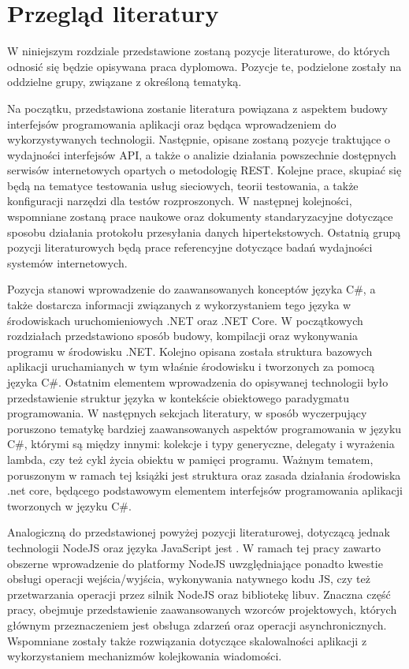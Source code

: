 \section{Przegląd literatury}
W niniejszym rozdziale przedstawione zostaną pozycje literaturowe, do których odnosić się będzie opisywana praca dyplomowa. Pozycje te, podzielone zostały na oddzielne grupy, związane z określoną tematyką.

Na początku, przedstawiona zostanie literatura powiązana z aspektem budowy interfejsów programowania aplikacji oraz będąca wprowadzeniem do wykorzystywanych technologii. Następnie, opisane zostaną pozycje traktujące o wydajności interfejsów API, a także o analizie działania powszechnie dostępnych serwisów internetowych opartych o metodologię REST. Kolejne prace, skupiać się będą na tematyce testowania usług sieciowych, teorii testowania, a także konfiguracji narzędzi dla testów rozproszonych. W następnej kolejności, wspomniane zostaną prace naukowe oraz dokumenty standaryzacyjne dotyczące sposobu działania protokołu przesyłania danych hipertekstowych. Ostatnią grupą pozycji literaturowych będą prace referencyjne dotyczące badań wydajności systemów internetowych.

Pozycja \cite{troelsen2017pro} stanowi wprowadzenie do zaawansowanych konceptów języka C\#, a także dostarcza informacji związanych z wykorzystaniem tego języka w środowiskach uruchomieniowych .NET oraz .NET Core. W początkowych rozdziałach przedstawiono sposób budowy, kompilacji oraz wykonywania programu w środowisku .NET. Kolejno opisana została struktura bazowych aplikacji uruchamianych w tym właśnie środowisku i tworzonych za pomocą języka C\#. Ostatnim elementem wprowadzenia do opisywanej technologii było przedstawienie struktur języka w kontekście obiektowego paradygmatu programowania.    W następnych sekcjach literatury, w sposób wyczerpujący poruszono tematykę bardziej zaawansowanych aspektów programowania w języku C\#, którymi są między innymi: kolekcje i typy generyczne, delegaty i wyrażenia lambda, czy też cykl życia obiektu w pamięci programu. Ważnym tematem, poruszonym w ramach tej książki jest struktura oraz zasada działania środowiska .net core, będącego podstawowym elementem interfejsów programowania aplikacji tworzonych w języku C\#.

Analogiczną do przedstawionej powyżej pozycji literaturowej, dotyczącą jednak technologii NodeJS oraz języka JavaScript jest \cite{casciaro2020node}. W ramach tej pracy zawarto obszerne wprowadzenie do platformy NodeJS uwzględniające ponadto kwestie obsługi operacji wejścia/wyjścia, wykonywania natywnego kodu JS, czy też przetwarzania operacji przez silnik NodeJS oraz bibliotekę libuv. Znaczna część pracy, obejmuje przedstawienie zaawansowanych wzorców projektowych, których głównym przeznaczeniem jest obsługa zdarzeń oraz operacji asynchronicznych. Wspomniane zostały także rozwiązania dotyczące skalowalności aplikacji z wykorzystaniem mechanizmów kolejkowania wiadomości.

